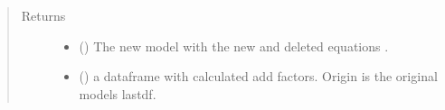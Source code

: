 \documentclass[letterpaper,10pt,english]{sphinxmanual}
\begin{document}
\begin{fulllineitems}
\begin{fulllineitems}
\begin{quote}
\begin{description}
\begin{itemize}
\end{itemize}

\item[{Returns}] \leavevmode
\sphinxAtStartPar
\begin{itemize}
\item {} 
\sphinxAtStartPar
{} () \textendash{} The new  model with the new and deleted equations .

\item {} 
\sphinxAtStartPar
{} () \textendash{} a dataframe with calculated add factors. Origin is the original models lastdf.

\end{itemize}


\end{description}\end{quote}

\end{fulllineitems}


\end{fulllineitems}

\end{document}
